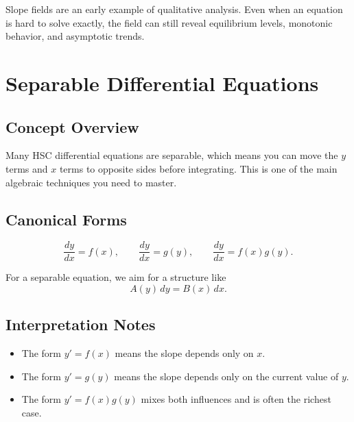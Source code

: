 \documentclass[12pt]{article}
\begin{document}

\begin{enrichmentbox}
Slope fields are an early example of qualitative analysis. Even when an equation is hard to solve exactly, the field can still reveal equilibrium levels, monotonic behavior, and asymptotic trends.
\end{enrichmentbox}

\section{Separable Differential Equations}

\subsection{Concept Overview}
Many HSC differential equations are separable, which means you can move the $y$ terms and $x$ terms to opposite sides before integrating. This is one of the main algebraic techniques you need to master.

\subsection{Canonical Forms}
\[
\frac{dy}{dx}=f(x),
\qquad
\frac{dy}{dx}=g(y),
\qquad
\frac{dy}{dx}=f(x)g(y).
\]

For a separable equation, we aim for a structure like
\[
A(y)\,dy = B(x)\,dx.
\]

\subsection{Interpretation Notes}
\begin{itemize}[leftmargin=*]
  \item The form $y'=f(x)$ means the slope depends only on $x$.
  \item The form $y'=g(y)$ means the slope depends only on the current value of $y$.
  \item The form $y'=f(x)g(y)$ mixes both influences and is often the richest case.
\end{itemize}
\end{document}
